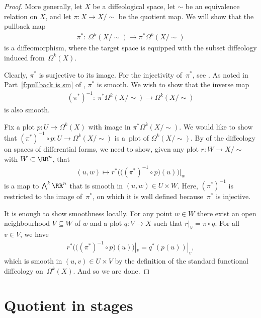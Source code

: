 \begin{proof}
More generally,
let $X$ be a dif\/feological space, let $\sim$ be an equivalence relation
on $X$, and let $\pi \colon X \to X/\!\!\sim$ be the quotient map.
We will show that the pullback map
\begin{gather*} \pi^* \colon \ \Omega^k(X/\!\!\sim) \to \pi^*\Omega^k(X/\!\!\sim) \end{gather*}
is a dif\/feomorphism,
where the target space is equipped with the subset dif\/feology
induced \linebreak from~$\Omega^k(X)$.

Clearly, $\pi^*$ is surjective to its image.
For the injectivity of~$\pi^*$, see .
As noted in Part~\eqref{f:pullback is sm} of ,
$\pi^*$ is smooth.
We wish to show that the inverse map
\begin{gather*} (\pi^*)^{-1} \colon \ \pi^*\Omega^k(X/\!\!\sim) \to \Omega^k(X/\!\!\sim) \end{gather*}
is also smooth.

Fix a plot $p \colon U \to \Omega^k(X)$
with image in $\pi^*\Omega^k(X/\!\!\sim)$.
We would like to show
that $(\pi^*)^{-1} \circ p \colon U \to \Omega^k(X/\!\!\sim)$
is a~plot of $\Omega^k(X/\!\!\sim)$.
By  of the dif\/feology
on spaces of dif\/ferential forms,
we need to show, given any plot $r \colon W \to X/\!\!\sim$
with $W \subset \RR^n$, that
\begin{gather*} (u,w)\mapsto r^* \big( \big( (\pi^*)^{-1} \circ p \big) (u) \big)\big|_w \end{gather*}
is a map to $\bigwedge^k \RR^n$ that is smooth in $(u,w) \in U \times W$.
Here, $(\pi^*)^{-1}$ is restricted to the image of~$\pi^*$,
on which it is well def\/ined because~$\pi^*$ is injective.

It is enough to show smoothness locally.
For any point $w\in W$ there exist an open neighbourhood $V\subseteq W$ of $w$
and a plot $q \colon V\to X$ such that $r|_V = \pi\circ q$.
For all $v\in V$, we have
\begin{gather*} r^* \big( \big((\pi^*)^{-1}\circ p\big)(u) \big)|_v = q^*(p(u))|_v,\end{gather*}
which is smooth in $(u,v) \in U \times V$
by the def\/inition of the standard functional dif\/feology on~$\Omega^k(X)$.
And so we are done.
\end{proof}

\section{Quotient in stages}\label{sec:q in stages}


